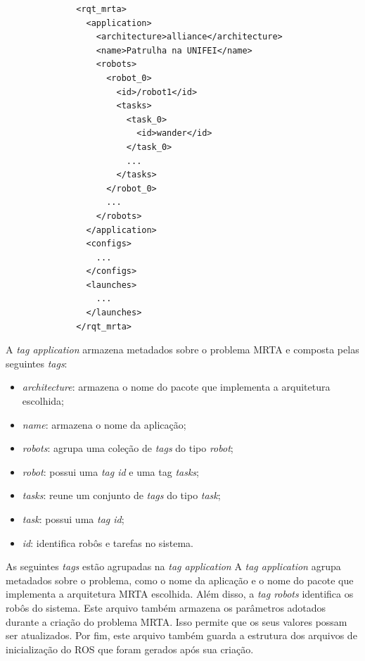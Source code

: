             \begin{lstlisting}
              <rqt_mrta>
                <application>
                  <architecture>alliance</architecture>
                  <name>Patrulha na UNIFEI</name>
                  <robots>
                    <robot_0>
                      <id>/robot1</id>
                      <tasks>
                        <task_0>
                          <id>wander</id>
                        </task_0>
                        ...
                      </tasks>
                    </robot_0>
                    ...
                  </robots>
                </application>
                <configs>
                  ...
                </configs>
                <launches>
                  ...
                </launches>
              </rqt_mrta>
            \end{lstlisting}
        
            A \textit{tag application} armazena metadados sobre o problema MRTA e composta pelas seguintes \textit{tags}:
            
            \begin{itemize}
                \item \textit{architecture}: armazena o nome do pacote que implementa a arquitetura escolhida;
                \item \textit{name}: armazena o nome da aplicação;
                \item \textit{robots}: agrupa uma coleção de \textit{tags} do tipo \textit{robot};
                \item \textit{robot}: possui uma \textit{tag id} e uma tag \textit{tasks};
                \item \textit{tasks}: reune um conjunto de \textit{tags} do tipo \textit{task};
                \item \textit{task}: possui uma \textit{tag id};
                \item \textit{id}: identifica robôs e tarefas no sistema.
            \end{itemize}
            
            As seguintes \textit{tags} estão agrupadas na \textit{tag application}
            A \textit{tag application} agrupa metadados sobre o problema, como o nome da aplicação e o nome do pacote que implementa a arquitetura MRTA escolhida. Além disso, a \textit{tag robots} identifica os robôs do sistema. Este arquivo também armazena os parâmetros adotados durante a criação do problema MRTA. Isso permite que os seus valores possam ser atualizados. Por fim, este arquivo também guarda a estrutura dos arquivos de inicialização do ROS que foram gerados após sua criação. 
        
